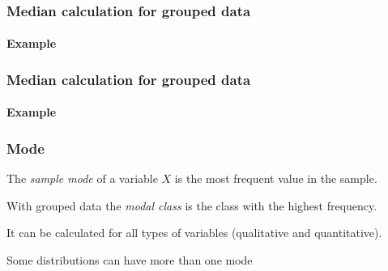 \begin{frame}
\frametitle{Median calculation for grouped data}
\framesubtitle{Example}

\begin{center}
\resizebox{0.8\textwidth}{!}{}
\end{center}
\end{frame}


\begin{frame}
\frametitle{Median calculation for grouped data}
\framesubtitle{Example}

\centering
{}

 
\end{frame}


\begin{frame}
\frametitle{Mode}
\begin{definition}
The \emph{sample mode} of a variable $X$ is the most frequent value in the sample.
\end{definition}

With grouped data the \emph{modal class} is the class with the highest frequency. 

It can be calculated for all types of variables (qualitative and quantitative). 

Some distributions can have more than one mode
\begin{center}
\scalebox{0.4}{}
\end{center}
\end{frame}


